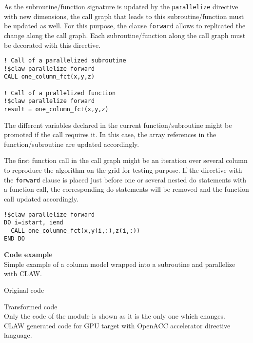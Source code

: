 As the subroutine/function signature is updated by the \lstinline!parallelize! 
directive with new dimensions, the call graph that leads to this 
subroutine/function must be updated as well. For this purpose, the clause 
\lstinline!forward! allows to replicated the change along the call graph. 
Each subroutine/function along the call graph must be decorated with this
directive.

\begin{lstlisting}
! Call of a parallelized subroutine
!$claw parallelize forward
CALL one_column_fct(x,y,z)

! Call of a prallelized function
!$claw parallelize forward
result = one_column_fct(x,y,z)
\end{lstlisting}

The different variables declared in the current function/subroutine might be
promoted if the call requires it. In this case, the array references in 
the function/subroutine are updated accordingly.

The first function call in the call graph might be an iteration over several
column to reproduce the algorithm on the grid for testing purpose. If the 
directive with the \lstinline!forward! clause is placed just before one or 
several nested do statements with a function call, the corresponding do 
statements will be removed and the function call updated accordingly. 

\begin{lstlisting}
!$claw parallelize forward
DO i=istart, iend
  CALL one_columne_fct(x,y(i,:),z(i,:))
END DO
\end{lstlisting}






\textbf{Code example}\\
\label{parallelize1}
Simple example of a column model wrapped into a subroutine and parallelize with
CLAW.

Original code



Transformed code\\
Only the code of the module is shown as it is the only one which changes.\\

CLAW generated code for GPU target with OpenACC accelerator directive language.


